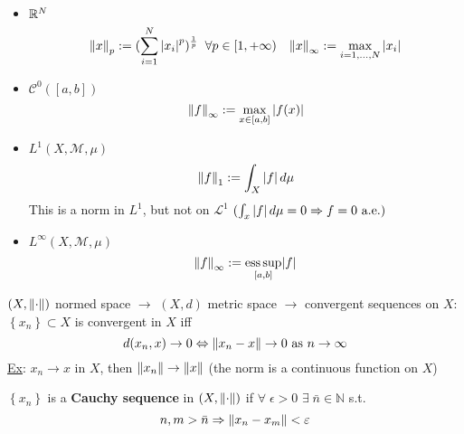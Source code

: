 \begin{itemize}
    \item \(\mathbb{R}^N\)
    \[
        \norm{x}_p := (\sum_{i = 1}^N \abs{x_i}^p)^{\frac{1}{p}} \; \; \forall p \in [1, +\infty) \quad
        \norm{x}_{\infty} := \max_{i = 1, \ldots, N} \abs{x_i}
    \]
    \item \(\mathcal{C}^0([a,b])\) \[\norm{f}_{\infty} := \max_{x \in [a,b]} \abs{f(x)}\]
    \item \(L^1(X, \mathcal{M}, \mu)\) \[\norm{f}_1 := \int_X \abs{f} \, d\mu\] This is a norm in \(L^1\), but not on \(\mathcal{L}^1\) \((\int_x \abs{f} \, d\mu = 0 \Rightarrow f = 0 \mbox{ a.e.})\)
    \item \(L^{\infty}(X, \mathcal{M}, \mu)\) \[\norm{f}_{\infty} := \underset{[a,b]}{\text{ess}\, \text{sup}} \abs{f}\]
\end{itemize}
\((X, \norm{\cdot})\) normed space \(\to\) \((X, d)\) metric space \(\to\) convergent sequences on \(X\): \(\left\{ x_n \right\} \subset X\) is convergent in \(X\) iff 
\[
    d(x_n, x) \to 0 \Leftrightarrow \norm{x_n -x} \to 0 \mbox{ as } n \to \infty
\]
\noindent\underline{Ex}: \(x_n \to x\) in \(X\), then \(\norm{x_n} \to \norm{x}\) (the norm is a continuous function on \(X\))
\begin{definition}
    \(\left\{ x_n \right\}\) is a \textbf{Cauchy sequence} in \((X, \norm{\cdot})\) if \(\forall \; \epsilon > 0\) \(\exists \; \bar{n} \in \mathbb{N}\) s.t. 
    \[
        n,m > \bar{n} \Rightarrow \norm{x_n-x_m} < \varepsilon
    \]
\end{definition}
